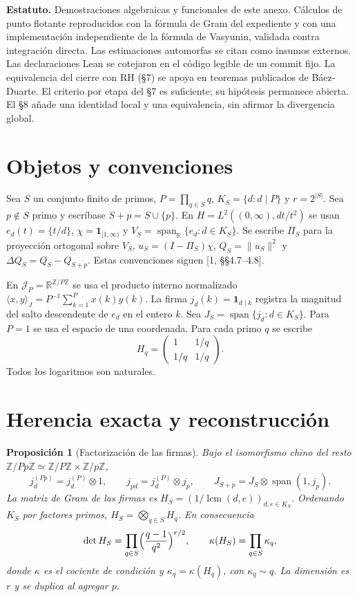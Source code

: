 \documentclass[11pt,a4paper]{article}
\theoremstyle{plain}
\newtheorem{proposicion}{Proposición}
\newcommand{\R}{\mathbb{R}}
\newcommand{\Z}{\mathbb{Z}}
\newcommand{\Jc}{\mathcal{J}}
\newcommand{\lcm}{\operatorname{lcm}}
\newcommand{\spn}{\operatorname{span}}
\begin{document}
\textbf{Estatuto.} Demostraciones algebraicas y funcionales de este anexo. Cálculos de punto flotante reproducidos con la fórmula de Gram del expediente y con una implementación independiente de la fórmula de Vasyunin, validada contra integración directa. Las estimaciones automorfas se citan como insumos externos. Las declaraciones Lean se cotejaron en el código legible de un commit fijo. La equivalencia del cierre con RH (§7) se apoya en teoremas publicados de Báez-Duarte. El criterio por etapa del §7 es suficiente; su hipótesis permanece abierta. El §8 añade una identidad local y una equivalencia, sin afirmar la divergencia global.

\section{Objetos y convenciones}

Sea $S$ un conjunto finito de primos, $P=\prod_{q\in S}q$, $K_S=\{d: d\mid P\}$ y $r=2^{|S|}$. Sea $p\notin S$ primo y escríbase $S+p=S\cup\{p\}$. En $H=L^2((0,\infty),dt/t^2)$ se usan $e_d(t)=\{t/d\}$, $\chi=\mathbf 1_{[1,\infty)}$ y $V_S=\spn_\R\{e_d: d\in K_S\}$. Se escribe $\Pi_S$ para la proyección ortogonal sobre $V_S$, $u_S=(I-\Pi_S)\chi$, $Q_S=\|u_S\|^2$ y $\Delta Q_S=Q_S-Q_{S+p}$. Estas convenciones siguen [1, §§4.7–4.8].

En $\Jc_P=\R^{\Z/P\Z}$ se usa el producto interno normalizado $\langle x,y\rangle_J=P^{-1}\sum_{k=1}^{P}x(k)y(k)$. La firma $j_d(k)=\mathbf 1_{d\mid k}$ registra la magnitud del salto descendente de $e_d$ en el entero $k$. Sea $J_S=\spn\{j_d: d\in K_S\}$. Para $P=1$ se usa el espacio de una coordenada. Para cada primo $q$ se escribe
\[
H_q=\begin{pmatrix}1 & 1/q\\ 1/q & 1/q\end{pmatrix}.
\]
Todos los logaritmos son naturales.

\section{Herencia exacta y reconstrucción}

\begin{proposicion}[Factorización de las firmas]\label{prop:fact}
Bajo el isomorfismo chino del resto $\Z/Pp\Z\simeq\Z/P\Z\times\Z/p\Z$,
\[
j^{(Pp)}_d=j^{(P)}_d\otimes 1,\qquad j_{pd}=j^{(P)}_d\otimes j_p,\qquad J_{S+p}=J_S\otimes\spn(1,j_p).
\]
La matriz de Gram de las firmas es $H_S=(1/\lcm(d,e))_{d,e\in K_S}$. Ordenando $K_S$ por factores primos, $H_S=\bigotimes_{q\in S}H_q$. En consecuencia
\[
\det H_S=\prod_{q\in S}\Bigl(\frac{q-1}{q^2}\Bigr)^{r/2},\qquad \kappa(H_S)=\prod_{q\in S}\kappa_q,
\]
donde $\kappa$ es el cociente de condición y $\kappa_q=\kappa(H_q)$, con $\kappa_q\sim q$. La dimensión es $r$ y se duplica al agregar $p$.
\end{proposicion}
\end{document}
